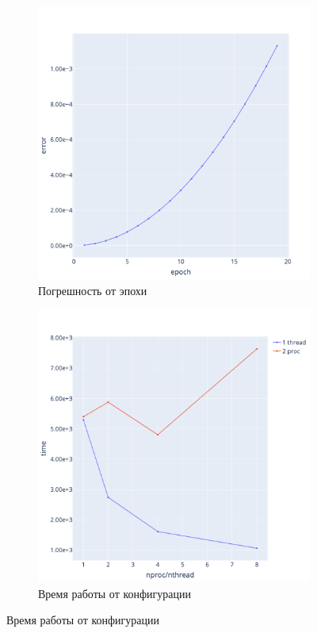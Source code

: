 \documentclass[a4paper,hidelinks,12pt]{article}
\begin{document}
\begin{figure}[H]
\begin{subfigure}{.5\textwidth}
  \centering
  \includegraphics[width=\linewidth]{pictures/L1_128_errs.png}
  \caption{Погрешность от эпохи}
\end{subfigure}%
\begin{subfigure}{.5\textwidth}
  \centering
  \includegraphics[width=\linewidth]{pictures/L1_128_perf.png}
  \caption{Время работы от конфигурации}
\end{subfigure}%
\end{figure}
\end{document}
